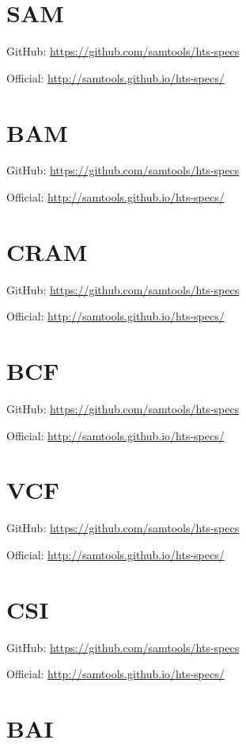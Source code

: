\documentclass[]{article}
\begin{document}
\section{SAM}

GitHub: \url{https://github.com/samtools/hts-specs}

Official: \url{http://samtools.github.io/hts-specs/}

\section{BAM}

GitHub: \url{https://github.com/samtools/hts-specs}

Official: \url{http://samtools.github.io/hts-specs/}

\section{CRAM}

GitHub: \url{https://github.com/samtools/hts-specs}

Official: \url{http://samtools.github.io/hts-specs/}

\section{BCF}

GitHub: \url{https://github.com/samtools/hts-specs}

Official: \url{http://samtools.github.io/hts-specs/}

\section{VCF}

GitHub: \url{https://github.com/samtools/hts-specs}

Official: \url{http://samtools.github.io/hts-specs/}

\section{CSI}

GitHub: \url{https://github.com/samtools/hts-specs}

Official: \url{http://samtools.github.io/hts-specs/}

\section{BAI}
\end{document}
